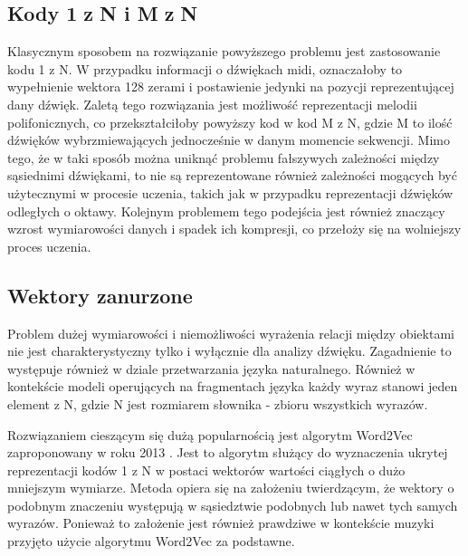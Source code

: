 {{        \subsection{Kody  1\,\,z\,\,N i  M\,\,z\,\,N}\label{sec:note-codes}
        {
            Klasycznym sposobem na rozwiązanie powyższego problemu jest zastosowanie kodu  1\,\,z\,\,N. W przypadku
            informacji o dźwiękach midi, oznaczałoby to wypełnienie wektora 128 zerami i postawienie jedynki na 
            pozycji reprezentującej dany dźwięk. 
            Zaletą tego rozwiązania jest możliwość reprezentacji melodii polifonicznych, co przekształciłoby
            powyższy kod w kod  M\,\,z\,\,N, gdzie M to ilość dźwięków wybrzmiewających jednocześnie w danym momencie sekwencji.
            Mimo tego, że w taki sposób można uniknąć problemu fałszywych zależności między sąsiednimi dźwiękami, 
            to nie są reprezentowane również zależności mogących być użytecznymi w procesie uczenia, 
            takich jak w przypadku reprezentacji dźwięków odległych o oktawy. 
            Kolejnym problemem tego podejścia jest również znaczący wzrost wymiarowości danych i spadek ich kompresji,
            co przełoży się na wolniejszy proces uczenia.
        }

        \subsection{Wektory zanurzone}\label{sec:embed}
        {
            Problem dużej wymiarowości i niemożliwości wyrażenia relacji między obiektami nie jest
            charakterystyczny tylko i wyłącznie dla analizy dźwięku. Zagadnienie to  występuje również w dziale
            przetwarzania języka naturalnego. Również w kontekście modeli operujących na fragmentach języka każdy wyraz stanowi
            jeden element z N, gdzie N jest rozmiarem słownika - zbioru wszystkich wyrazów.

            Rozwiązaniem cieszącym się dużą popularnością jest algorytm Word2Vec zaproponowany w roku 2013 \cite{Mikolov2013EfficientEO}.
            Jest to algorytm służący do wyznaczenia ukrytej reprezentacji kodów  1\,\,z\,\,N w postaci wektorów wartości ciągłych
            o dużo mniejszym wymiarze. Metoda opiera się na założeniu twierdzącym, że wektory 
            o podobnym znaczeniu występują w sąsiedztwie podobnych lub nawet tych samych wyrazów. Ponieważ to założenie 
            jest również prawdziwe w kontekście muzyki przyjęto użycie algorytmu Word2Vec za podstawne.
            
}}}
